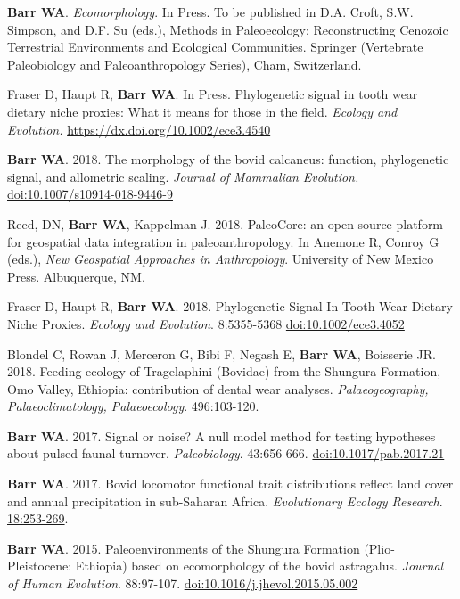 \documentclass{article}
\begin{document}
\begin{etaremune}

\item {\bfseries Barr WA}. \emph{Ecomorphology}. In Press. To be published in D.A. Croft, S.W. Simpson, and D.F. Su (eds.), Methods in Paleoecology: Reconstructing Cenozoic Terrestrial Environments and Ecological Communities. Springer (Vertebrate Paleobiology and Paleoanthropology Series), Cham, Switzerland.
\item Fraser D, Haupt R,  {\bfseries Barr WA}. In Press. Phylogenetic signal in tooth wear dietary niche proxies: What it means for those in the field. \emph{Ecology and Evolution.} \href{doi:10.1002/ece3.4540}{https://dx.doi.org/10.1002/ece3.4540}
\item {\bfseries Barr WA}. 2018. The morphology of the bovid calcaneus: function, phylogenetic signal, and allometric scaling. \emph{Journal of Mammalian Evolution.} \href{https://dx.doi.org/10.1007/s10914-018-9446-9}{doi:10.1007/s10914-018-9446-9}
\item  Reed, DN, {\bfseries Barr WA}, Kappelman J. 2018. PaleoCore: an open-source platform for geospatial data integration in paleoanthropology. In Anemone R, Conroy G (eds.), \emph{New Geospatial Approaches in Anthropology}. University of New Mexico Press. Albuquerque, NM.
\item  Fraser D, Haupt R,  {\bfseries Barr WA}. 2018. Phylogenetic Signal In Tooth Wear Dietary Niche Proxies. \emph{Ecology and Evolution}. 8:5355-5368 \href{https://doi.org/10.1002/ece3.4052}{doi:10.1002/ece3.4052}
\item  Blondel C, Rowan J, Merceron G, Bibi F,  Negash E, {\bfseries Barr WA}, Boisserie JR. 2018. Feeding ecology of Tragelaphini (Bovidae) from the Shungura Formation, Omo Valley, Ethiopia: contribution of dental wear analyses.  \emph{Palaeogeography, Palaeoclimatology, Palaeoecology}. 496:103-120.
\item  {\bfseries Barr WA}. 2017. Signal or noise? A null model method for testing hypotheses about pulsed faunal turnover. \emph{Paleobiology}. 43:656-666. \href{https://doi.org/10.1017/pab.2017.21}{doi:10.1017/pab.2017.21}
\item  {\bfseries Barr WA}. 2017. Bovid locomotor functional trait distributions reflect land cover and annual precipitation in sub-Saharan Africa. \emph{Evolutionary Ecology Research}.  \href{http://www.evolutionary-ecology.com/issues/v18/n03/ddar3051.pdf}{18:253-269}.
\item  {\bfseries Barr WA}. 2015. Paleoenvironments of the Shungura Formation (Plio-Pleistocene: Ethiopia) based on ecomorphology of the bovid astragalus. \emph{Journal of Human Evolution}. 88:97-107. \href{http://dx.doi.org/10.1016/j.jhevol.2015.05.002}{doi:10.1016/j.jhevol.2015.05.002}

\end{etaremune}
\end{document}
